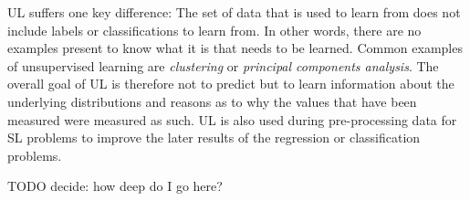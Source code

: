 \acl {UL}  suffers one key difference: The set of data that is used to learn from does not include labels or
classifications to learn from. In other words, there are no examples present to know what it is that needs to be
learned. Common examples of unsupervised learning are \emph{clustering} or \emph{principal components analysis}. The
overall goal of \ac {UL} is therefore not to predict but to learn information about the underlying distributions and
reasons as to why the values that have been measured were measured as such. \ac {UL} is also used during pre-processing
data for \ac {SL} problems to improve the later results of the regression or classification problems. 

TODO decide: how deep do I go here?
